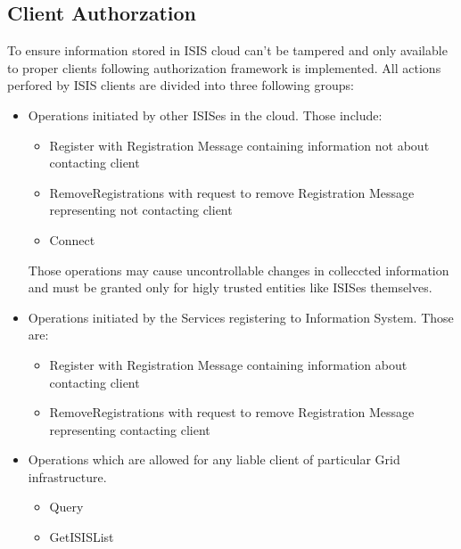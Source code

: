 \documentclass{book}
\begin{document}
\subsection{Client Authorzation}
\label{sub:isis_authorization_client_authorization}


To ensure information stored in ISIS cloud can't be tampered and only available to proper clients following authorization framework is implemented. All actions perfored by ISIS clients are divided into three following groups:

\begin{itemize}
 \item Operations initiated by other ISISes in the cloud. Those include:
 \begin{itemize}
  \item Register with Registration Message containing information not about contacting client
  \item RemoveRegistrations with request to remove Registration Message representing not contacting client
  \item Connect %
 \end{itemize}

 Those operations may cause uncontrollable changes in colleccted information and must be granted only for higly trusted entities like ISISes themselves.

 \item Operations initiated by the Services registering to Information System. Those are:
 \begin{itemize}
  \item Register with Registration Message containing information about contacting client
  \item RemoveRegistrations with request to remove Registration Message representing contacting client
 \end{itemize}

 \item Operations which are allowed for any liable client of particular Grid infrastructure.
 \begin{itemize}
  \item Query
  \item GetISISList
 \end{itemize}
\end{itemize}

\end{document}
